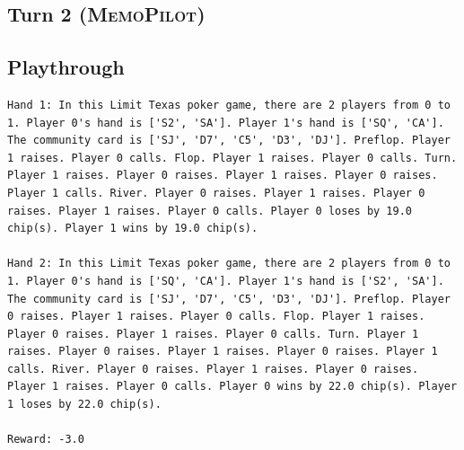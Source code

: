\documentclass{article}
\newcommand{\methodname}{MemoPilot}
\newcommand{\method}{\textsc{\methodname}}
\theoremstyle{plain}
\theoremstyle{definition}
\theoremstyle{remark}
\begin{document}
\begin{tcolorbox}[breakable]
\subsection*{Turn 2 (\method{})}
\vspace{-5pt}

\subsection*{Playthrough }
\vspace{-5pt}
\begin{lstlisting}[basicstyle=\scriptsize\ttfamily, breaklines=true]
Hand 1: In this Limit Texas poker game, there are 2 players from 0 to 1. Player 0's hand is ['S2', 'SA']. Player 1's hand is ['SQ', 'CA']. The community card is ['SJ', 'D7', 'C5', 'D3', 'DJ']. Preflop. Player 1 raises. Player 0 calls. Flop. Player 1 raises. Player 0 calls. Turn. Player 1 raises. Player 0 raises. Player 1 raises. Player 0 raises. Player 1 calls. River. Player 0 raises. Player 1 raises. Player 0 raises. Player 1 raises. Player 0 calls. Player 0 loses by 19.0 chip(s). Player 1 wins by 19.0 chip(s).

Hand 2: In this Limit Texas poker game, there are 2 players from 0 to 1. Player 0's hand is ['SQ', 'CA']. Player 1's hand is ['S2', 'SA']. The community card is ['SJ', 'D7', 'C5', 'D3', 'DJ']. Preflop. Player 0 raises. Player 1 raises. Player 0 calls. Flop. Player 1 raises. Player 0 raises. Player 1 raises. Player 0 calls. Turn. Player 1 raises. Player 0 raises. Player 1 raises. Player 0 raises. Player 1 calls. River. Player 0 raises. Player 1 raises. Player 0 raises. Player 1 raises. Player 0 calls. Player 0 wins by 22.0 chip(s). Player 1 loses by 22.0 chip(s).

Reward: -3.0
\end{lstlisting}
\vspace{5pt}


\end{tcolorbox}
\end{document}
